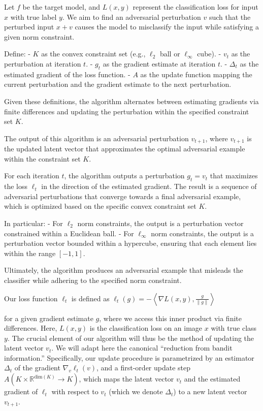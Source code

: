 Let \( f \) be the target model, and \( L(x, y) \) represent the classification loss for input \( x \) with true label \( y \). We aim to find an adversarial perturbation \( v \) such that the perturbed input \( x + v \) causes the model to misclassify the input while satisfying a given norm constraint.

Define:
- \( K \) as the convex constraint set (e.g., \( \ell_2 \) ball or \( \ell_\infty \) cube).
- \( v_t \) as the perturbation at iteration \( t \).
- \( g_t \) as the gradient estimate at iteration \( t \).
- \( \Delta_t \) as the estimated gradient of the loss function.
- \( A \) as the update function mapping the current perturbation and the gradient estimate to the next perturbation.

Given these definitions, the algorithm alternates between estimating gradients via finite differences and updating the perturbation within the specified constraint set \( K \).

The output of this algorithm is an adversarial perturbation $v_{t+1}$, where $v_{t+1}$ is the updated latent vector that approximates the optimal adversarial example within the constraint set $K$. 

For each iteration $t$, the algorithm outputs a perturbation $g_t = v_t$ that maximizes the loss $\ell_t$ in the direction of the estimated gradient. The result is a sequence of adversarial perturbations that converge towards a final adversarial example, which is optimized based on the specific convex constraint set $K$. 

In particular:
- For $\ell_2$ norm constraints, the output is a perturbation vector constrained within a Euclidean ball.
- For $\ell_\infty$ norm constraints, the output is a perturbation vector bounded within a hypercube, ensuring that each element lies within the range $[-1, 1]$.

Ultimately, the algorithm produces an adversarial example that misleads the classifier while adhering to the specified norm constraint.

Our loss function $\ell_t$ is defined as
$\ell_t(g) = -\left\langle \nabla L(x, y), \frac{g}{\|g\|} \right\rangle$

for a given gradient estimate $g$, where we access this inner product via finite differences. Here, $L(x, y)$ is the classification loss on an image $x$ with true class $y$. The crucial element of our algorithm will thus be the method of updating the latent vector $v_t$. We will adapt here the canonical “reduction from bandit information.” Specifically, our update procedure is parametrized by an estimator $\Delta_t$ of the gradient $\nabla_v \ell_t(v)$, and a first-order update step $A (K \times \mathbb{R}^{\text{dim}(K)} \to K)$, which maps the latent vector $v_t$ and the estimated gradient of $\ell_t$ with respect to $v_t$ (which we denote $\Delta_t$) to a new latent vector $v_{t+1}$.

